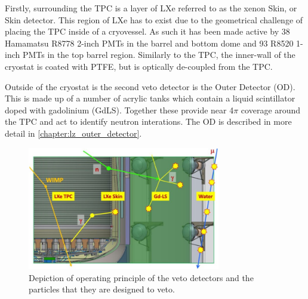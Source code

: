 \par
Firstly, surrounding the TPC is a layer of LXe referred to as the xenon Skin, or Skin detector.
This region of LXe has to exist due to the geometrical challenge of placing the TPC inside of a cryovessel.
As such it has been made active by 38 Hamamatsu R8778 2-inch PMTs in the barrel and bottom dome and 93 R8520 1-inch PMTs in the top barrel region.
Similarly to the TPC, the inner-wall of the cryostat is coated with PTFE, but is optically de-coupled from the TPC.

\par
Outside of the cryostat is the second veto detector is the Outer Detector (OD).
This is made up of a number of acrylic tanks which contain a liquid scintillator doped with gadolinium (GdLS).
Together these provide near 4$\pi$ coverage around the TPC and act to identify neutron interations.
The OD is described in more detail in \autoref{chapter:lz_outer_detector}.

\begin{figure}
    \centering
    \includegraphics[width=0.75\textwidth]{Figures/LZ/lz_veto_plan.png}
    \caption{Depiction of operating principle of the veto detectors and the particles that they are designed to veto.}
    \label{fig:LZ_Veto_Principle}
\end{figure}


